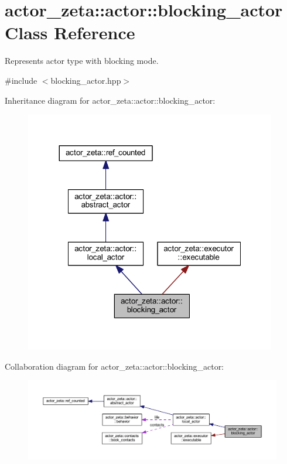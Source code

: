 \hypertarget{classactor__zeta_1_1actor_1_1blocking__actor}{}\section{actor\+\_\+zeta\+:\+:actor\+:\+:blocking\+\_\+actor Class Reference}
\label{classactor__zeta_1_1actor_1_1blocking__actor}


Represents actor type with blocking mode.  




{\ttfamily \#include $<$blocking\+\_\+actor.\+hpp$>$}



Inheritance diagram for actor\+\_\+zeta\+:\+:actor\+:\+:blocking\+\_\+actor\+:\nopagebreak
\begin{figure}[H]
\begin{center}
\leavevmode
\includegraphics[width=311pt]{classactor__zeta_1_1actor_1_1blocking__actor__inherit__graph}
\end{center}
\end{figure}


Collaboration diagram for actor\+\_\+zeta\+:\+:actor\+:\+:blocking\+\_\+actor\+:\nopagebreak
\begin{figure}[H]
\begin{center}
\leavevmode
\includegraphics[width=350pt]{classactor__zeta_1_1actor_1_1blocking__actor__coll__graph}
\end{center}
\end{figure}
